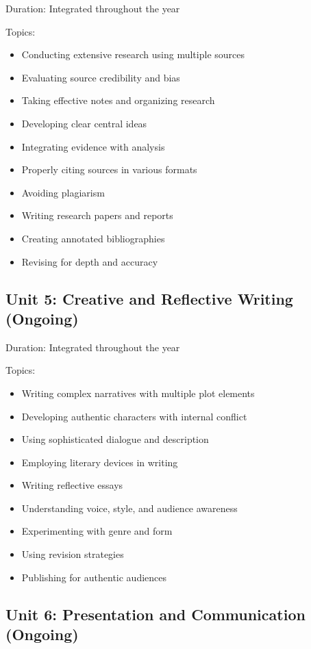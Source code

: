 \documentclass[11pt,letterpaper]{report}
\begin{document}
Duration: Integrated throughout the year

Topics:
\begin{itemize}
\item Conducting extensive research using multiple sources
\item Evaluating source credibility and bias
\item Taking effective notes and organizing research
\item Developing clear central ideas
\item Integrating evidence with analysis
\item Properly citing sources in various formats
\item Avoiding plagiarism
\item Writing research papers and reports
\item Creating annotated bibliographies
\item Revising for depth and accuracy
\end{itemize}

\subsection{Unit 5: Creative and Reflective Writing (Ongoing)}

Duration: Integrated throughout the year

Topics:
\begin{itemize}
\item Writing complex narratives with multiple plot elements
\item Developing authentic characters with internal conflict
\item Using sophisticated dialogue and description
\item Employing literary devices in writing
\item Writing reflective essays
\item Understanding voice, style, and audience awareness
\item Experimenting with genre and form
\item Using revision strategies
\item Publishing for authentic audiences
\end{itemize}

\subsection{Unit 6: Presentation and Communication (Ongoing)}
\end{document}
